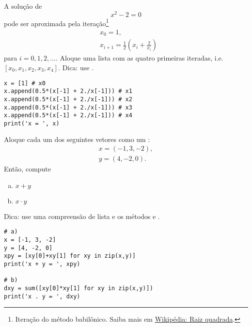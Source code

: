 \begin{exer}
  A solução de
  \begin{equation}
    x^2 - 2 = 0
  \end{equation}
  pode ser aproximada pela iteração\footnote{Iteração do método babilônico. Saiba mais em \href{https://pt.wikipedia.org/wiki/Raiz_quadrada\#M\%C3\%A9todo_babil\%C3\%B4nico}{Wikipédia: Raiz quadrada}.}
  \begin{align}
    &x_0 = 1,\\
    &x_{i+1} = \frac{1}{2}\left(x_{i} + \frac{2}{x_i}\right)
  \end{align}
  para $i = 0, 1, 2, \ldots$. Aloque uma lista com as quatro primeiras iteradas, i.e. $[x_0, x_1, x_2, x_3, x_4]$. Dica: use {\PYTHONlistDOTappend}.
\end{exer}
\begin{resp}
  
\begin{lstlisting}
x = [1] # x0
x.append(0.5*(x[-1] + 2./x[-1])) # x1
x.append(0.5*(x[-1] + 2./x[-1])) # x2
x.append(0.5*(x[-1] + 2./x[-1])) # x3
x.append(0.5*(x[-1] + 2./x[-1])) # x4
print('x = ', x)
\end{lstlisting}

\end{resp}

\begin{exer}
  Aloque cada um dos seguintes vetores como um {\PYTHONlist}:
  \begin{align}
    x = (-1, 3, -2),\\
    y = (4, -2, 0).
  \end{align}
  Então, compute
  \begin{enumerate}[a)]
  \item $x+y$
  \item $x\cdot y$
  \end{enumerate}
  Dica: use uma compreensão de lista e os métodos {\PYTHONzip} e {\PYTHONsum}.
\end{exer}
\begin{resp}

\begin{lstlisting}
# a)
x = [-1, 3, -2]
y = [4, -2, 0]
xpy = [xy[0]+xy[1] for xy in zip(x,y)]
print('x + y = ', xpy)

# b)
dxy = sum([xy[0]*xy[1] for xy in zip(x,y)])
print('x . y = ', dxy)
\end{lstlisting}

\end{resp}

